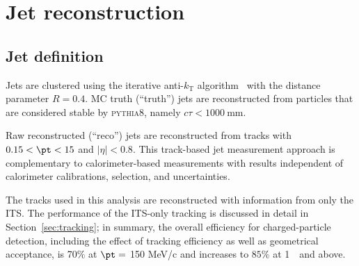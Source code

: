 

\section{Jet reconstruction}
\subsection{Jet definition}
\label{sec:jetreco}
Jets are clustered using the iterative anti-$k_{\mathrm{T}}$ algorithm~\cite{Cacciari:2008gp} with the distance parameter $R = 0.4$. MC truth (``truth'') jets are reconstructed from particles that are considered stable by \textsc{pythia8}, namely {$c\tau < 1000\:\mathrm{mm}$}. 

Raw reconstructed (``reco'') jets are reconstructed from tracks with {$0.15<\pt<15$ \GeVc} and $|\eta|<0.8$. This track-based jet measurement approach is complementary to calorimeter-based measurements with results independent of calorimeter calibrations, selection, and uncertainties. 

The tracks used in this analysis are reconstructed with information from only the ITS. The performance of the ITS-only tracking is discussed in detail in Section~\ref{sec:tracking}; in summary, the overall efficiency for charged-particle detection, including the effect of tracking efficiency as well as geometrical acceptance, is 70$\%$ at $\pt=$ 150 MeV/c and increases to $85\%$ at 1~\GeVc~and above. 






